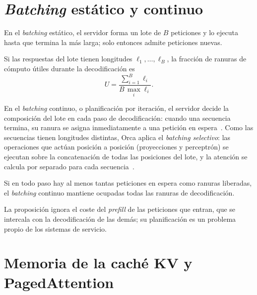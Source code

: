 \section{\emph{Batching} estático y continuo}

\begin{definicion}\label{def:estatico}
En el \emph{batching} estático, el servidor forma un lote de $B$ peticiones y lo ejecuta hasta que termina la más larga; solo entonces admite peticiones nuevas.
\end{definicion}

\begin{proposicion}\label{prop:utilizacion}
Si las respuestas del lote tienen longitudes $\ell_1,\dots,\ell_B$, la fracción de ranuras de cómputo útiles durante la decodificación es
\[
U=\frac{\sum_{i=1}^{B}\ell_i}{B\,\max_i\ell_i}.
\]
\end{proposicion}

\begin{definicion}\label{def:continuo}
En el \emph{batching} continuo, o planificación por iteración, el servidor decide la composición del lote en cada paso de decodificación: cuando una secuencia termina, su ranura se asigna inmediatamente a una petición en espera~\cite{orca}. Como las secuencias tienen longitudes distintas, Orca aplica el \emph{batching selectivo}: las operaciones que actúan posición a posición (proyecciones y perceptrón) se ejecutan sobre la concatenación de todas las posiciones del lote, y la atención se calcula por separado para cada secuencia~\cite{orca,cs336}.
\end{definicion}

\addtocounter{figure}{1}%

\begin{proposicion}\label{prop:continuo}
Si en todo paso hay al menos tantas peticiones en espera como ranuras liberadas, el \emph{batching} continuo mantiene ocupadas todas las ranuras de decodificación.
\end{proposicion}

La proposición ignora el coste del \emph{prefill} de las peticiones que entran, que se intercala con la decodificación de las demás; su planificación es un problema propio de los sistemas de servicio.

\section{Memoria de la caché KV y PagedAttention}


